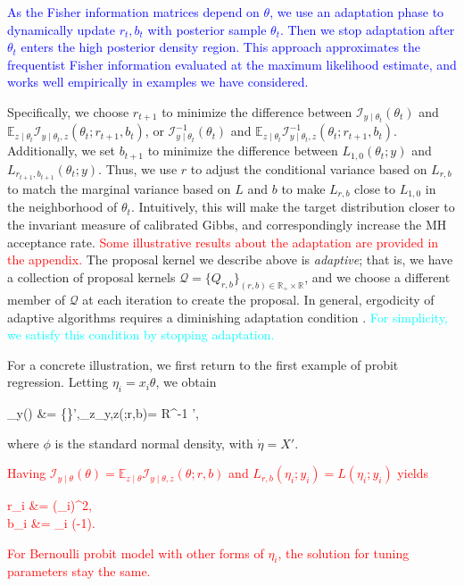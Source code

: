 \documentclass[11pt]{article}
\newcommand{\leojames}[1]{\textcolor{blue}{#1}}
\newcommand{\leo}[1]{{\textcolor{red}{#1}}}
\newcommand{\dave}[1]{{\textcolor{cyan}{#1}}}
\newcommand{\be}{\begin{equs}}
\newcommand{\ee}{\end{equs}}
\newcommand{\bb}[1]{\mathbb{#1}}
\newcommand{\mc}[1]{\mathcal{#1}}
\newcommand{\diag}{\text{diag}}
\begin{document}
\leojames{As the Fisher information matrices depend on $\theta$, we use  an adaptation phase to dynamically update $r_t,b_t$ with posterior sample $\theta_t$. Then
we stop adaptation after $\theta_t$ enters the high posterior
density region. This approach approximates the frequentist Fisher information evaluated at the maximum likelihood estimate,
and works well empirically in examples we have considered.}

 Specifically, we choose $r_{t+1}$ to minimize the  difference between $\mc  I_{y\mid \theta_{t}}(\theta_{t})$
and $\bb E_{z\mid \theta_{t}}\mc I_{y\mid \theta_{t},z}(\theta_{t};r_{t+1},b_{t})$, or $\mc  I^{-1}_{y\mid \theta_{t}}(\theta_{t})$
and $\bb E_{z\mid \theta_{t}}\mc I^{-1}_{y\mid \theta_{t},z}(\theta_{t};r_{t+1},b_{t})$.
Additionally, we set $b_{t+1}$ to minimize the difference between $L_{1,0}(\theta_t;y)$ and $L_{r_{t+1},b_{t+1}}(\theta_t;y)$. Thus, we use $r$ to adjust the conditional variance based on $L_{r,b}$ to match the marginal variance based on $L$ and $b$ to make $L_{r,b}$ close to $L_{1,0}$ in the neighborhood of $\theta_t$. Intuitively, this will make the target distribution closer to the invariant measure of calibrated Gibbs, and correspondingly increase the MH acceptance rate. \leo{Some illustrative results about the adaptation
are provided in the appendix.} The proposal kernel we describe above is \emph{adaptive}; that is, we have a collection of proposal kernels $\mc Q = \{Q_{r,b}\}_{(r,b) \in \bb R_+ \times \bb R}$, and we choose a different member of $\mc Q$ at each iteration to create the proposal. 
In general, ergodicity of adaptive algorithms requires a diminishing adaptation condition \citep{roberts2007coupling}.  \dave{For simplicity, we satisfy this condition by stopping adaptation.}

For a concrete illustration, we first return to the first example of probit regression. Letting $\eta_i = x_i\theta$, we obtain
\be
\mc I_{y\mid \theta}({\theta}) &=  \dot\eta\diag\bigg\{\bigg\}\dot\eta',\qquad \bb E_{z\mid \theta}\mc I_{y\mid \theta,z}({\theta};r,b)= \dot\eta R^{-1} \dot\eta',
\ee
 where $\phi$ is the standard normal density, with $\dot\eta=X'$. \leo{Having $\mc I_{y\mid \theta}({\theta})= \bb
 E_{z\mid \theta}\mc I_{y\mid \theta,z}({\theta};r,b)$  and $L_{r,b}(\eta_i;y_i)= L(\eta_i;y_i)
$  yields 
\be
r_i &= \frac{\Phi(\eta_i)(1- \Phi(\eta_i))} {\phi(\eta_i)^2},\\
b_i &= \eta_i (\sqrt{r_i}-1).
\ee
 For Bernoulli probit model with other forms of $\eta_i$, the solution for tuning parameters stay the same.}
\end{document}
